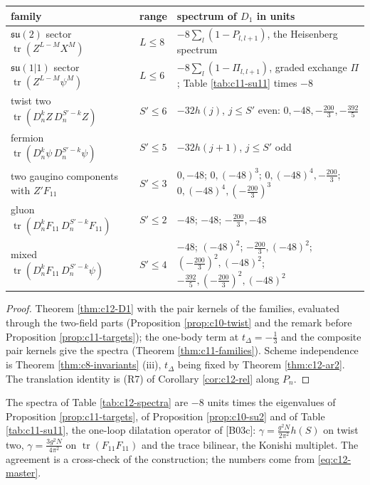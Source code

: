 \begin{tabular}{l|l|l}
family & range & spectrum of $D_1$ in units\\
\hline
$\mathfrak{su}(2)$ sector $\operatorname{tr}(Z^{L-M}X^M)$ & $L\le8$ & $-8\sum_l(1-P_{l,l+1})$, the Heisenberg spectrum\\
$\mathfrak{su}(1|1)$ sector $\operatorname{tr}(Z^{L-M}\psi^M)$ & $L\le6$ & $-8\sum_l(1-\Pi_{l,l+1})$, graded exchange $\Pi$; Table \ref{tab:c11-su11} times $-8$\\
twist two $\operatorname{tr}(D_n^kZ\,D_n^{S'-k}Z)$ & $S'\le6$ & $-32h(j)$, $j\le S'$ even: $0,-48,-\tfrac{200}3,-\tfrac{392}5$\\
fermion $\operatorname{tr}(D_n^k\psi\,D_n^{S'-k}\psi)$ & $S'\le5$ & $-32h(j+1)$, $j\le S'$ odd\\
two gaugino components with $Z'F_{11}$ & $S'\le3$ & $0,-48$; $0,(-48)^3$; $0,(-48)^4,-\tfrac{200}3$; $0,(-48)^4,(-\tfrac{200}3)^3$\\
gluon $\operatorname{tr}(D_n^kF_{11}\,D_n^{S'-k}F_{11})$ & $S'\le2$ & $-48$; $-48$; $-\tfrac{200}3,-48$\\
mixed $\operatorname{tr}(D_n^kF_{11}\,D_n^{S'-k}\psi)$ & $S'\le4$ & $-48$; $(-48)^2$; $-\tfrac{200}3,(-48)^2$; $(-\tfrac{200}3)^2,(-48)^2$; $-\tfrac{392}5,(-\tfrac{200}3)^2,(-48)^2$\\
\end{tabular}

\begin{proof}
Theorem \ref{thm:c12-D1} with the pair kernels of the families, evaluated through the two-field parts (Proposition \ref{prop:c10-twist} and the remark before Proposition \ref{prop:c11-targets}); the one-body term at $t_\Delta=-\tfrac13$ and the composite pair kernels give the spectra (Theorem \ref{thm:c11-families}). Scheme independence is Theorem \ref{thm:c8-invariants} (iii), $t_\Delta$ being fixed by Theorem \ref{thm:c12-ar2}. The translation identity is (R7) of Corollary \ref{cor:c12-rel} along $P_n$.
\end{proof}

\begin{remark}
\label{rem:c12-specref}
The spectra of Table \ref{tab:c12-spectra} are $-8$ units times the eigenvalues of Proposition \ref{prop:c11-targets}, of Proposition \ref{prop:c10-su2} and of Table \ref{tab:c11-su11}, the one-loop dilatation operator of [B03c]: $\gamma=\tfrac{g^2N}{2\pi^2}h(S)$ on twist two, $\gamma=\tfrac{3g^2N}{4\pi^2}$ on $\operatorname{tr}(F_{11}F_{11})$ and the trace bilinear, the Konishi multiplet. The agreement is a cross-check of the construction; the numbers come from \eqref{eq:c12-master}.
\end{remark}


